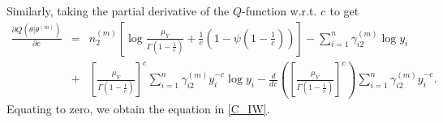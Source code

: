 \documentclass[12pt, draftclsnofoot, onecolumn]{IEEEtran}
\theoremstyle{plain}
\begin{document}
Similarly, taking the partial derivative of the $Q$-function w.r.t. ${{c_{}}}$ to get
\begin{eqnarray}\label{Theo2eq2}
\frac{\partial Q\left({{{\theta}}}|{{{\theta}}}^{(m)} \right)}{\partial {{c_{}}}}&=& n_2^{(m)} \left[ \log \frac{\mu_Y}{\Gamma(1-\frac{1}{{{c_{}}}})} + \frac{1}{{{c_{}}}} \left(1-\psi(1-\frac{1}{{{c_{}}}}) \right) \right] - \sum_{i=1}^n \gamma_{i2}^{(m)} \log y_i \nonumber\\
%
&+& \left[ \frac{\mu_Y}{\Gamma(1-\frac{1}{{{c_{}}}})} \right]^{{{c_{}}}} \sum_{i=1}^n \gamma_{i2}^{(m)} y_i^{-{{c_{}}}} \log y_i %
%
-\frac{d}{d {{c_{}}}} \left( \left[ \frac{\mu_Y}{\Gamma(1-\frac{1}{{{c_{}}}})} \right]^{{{c_{}}}} \right) \sum_{i=1}^n \gamma_{i2}^{(m)} y_i^{-{{c_{}}}}. 
\end{eqnarray}
Equating to zero, we obtain the equation in \eqref{C_IW}.
\vspace{-.15in}
\end{document}

